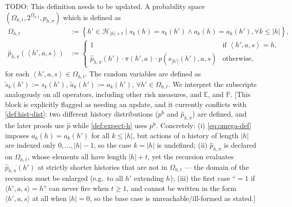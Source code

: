 \documentclass[letterpaper]{article}
\theoremstyle{plain}
\theoremstyle{definition}
\theoremstyle{remark}
\newcommand{\E}{\mathbb{E}}
\newcommand{\cc}[1]{\textcolor{ccolor}{[#1]}}
\begin{document}
TODO: This definition needs to be updated. 
A probability space $(\Omega_{h,t}, 2^{\Omega_{h,t} }, \hat{p}_{h,\pi})$ which is defined as
\begin{align}
\label{eq:omega-def}
  \Omega_{h,t} &:= \left\{ h' \in \mathcal{H}_{|h| + t} \mid s_k(h) = s_k(h') \wedge a_k(h) = a_k(h'), \forall k \le |h| \right\}, \\
  \label{eq:phat-def}
\hat{p}_{h,\pi}\left(\left< h', a, s \right>\right)
&:= \begin{cases}
1 &\text{if } \left< h', a, s \right> = h, \\
\hat{p}_{h,\pi}(h') \cdot  \pi(h', a) \cdot p(s_{|h'|}(h'), a, s)
&\text{otherwise},
\end{cases}
\end{align}
for each $\left< h', a, s \right> \in \Omega_{h,t}$. The random variables are defined as $\tilde{s}_k(h') := s_k(h')$, $\tilde{a}_k(h') := a_k(h')$, $\forall h'\in \Omega_{h,t}$. We interpret the subscripts analogously on all operators, including other risk measures, and $\E$, and $\mathbb{P}$.
\cc{This block is explicitly flagged as needing an update, and it currently conflicts with \cref{def:hist-dist}: two different history distributions ($p^{\mathrm{h}}$ and $\hat{p}_{h,\pi}$) are defined, and the later proofs use $\hat{p}$ while \cref{def:expect-h} uses $p^{\mathrm{h}}$. Concretely: (i) \eqref{eq:omega-def} imposes $a_k(h)=a_k(h')$ for all $k\le |h|$, but actions of a history of length $|h|$ are indexed only $0,\dots,|h|-1$, so the case $k=|h|$ is undefined; (ii) $\hat{p}_{h,\pi}$ is declared on $\Omega_{h,t}$, whose elements all have length $|h|+t$, yet the recursion evaluates $\hat{p}_{h,\pi}(h')$ at strictly shorter histories that are not in $\Omega_{h,t}$ --- the domain of the recursion must be enlarged (e.g.\ to all $h'$ extending $h$); (iii) the first case ``$=1$ if $\langle h',a,s\rangle = h$'' can never fire when $t\ge 1$, and cannot be written in the form $\langle h',a,s\rangle$ at all when $|h|=0$, so the base case is unreachable/ill-formed as stated.}
\end{document}
